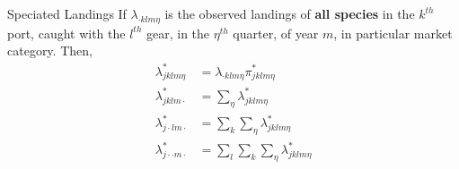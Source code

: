 \documentclass[ xcolor = pdftex, dvipsnames, table ]{beamer}
\begin{document}
%
%

\begin{frame}{Speciated Landings}
If $\lambda_{\cdot klm\eta}$ is the observed landings of \textbf{all species} in the $k^{th}$ port, caught with the $l^{th}$ gear, in the $\eta^{th}$ quarter, of year $m$, in particular market category. Then,
\begin{align*}
	\lambda^*_{jklm\eta} &=\lambda_{\cdot k l m \eta}\pi^*_{jklm\eta}\\%
	\lambda^*_{jklm\cdot} &=\sum_{\eta}\lambda^*_{jklm\eta}\\
	\lambda^*_{j\cdot lm\cdot} &=\sum_{k}\sum_{\eta}\lambda^*_{jklm\eta}\\
	\lambda^*_{j\cdot \cdot m\cdot} &=\sum_{l}\sum_{k}\sum_{\eta}\lambda^*_{jklm\eta}
\end{align*}
\end{frame}

%
%
\end{document}
